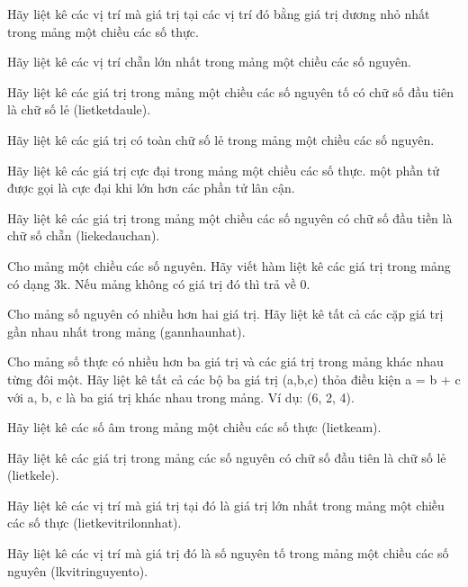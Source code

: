 \begin{problem}
    Hãy liệt kê các vị trí mà giá trị tại các vị trí đó bằng giá trị dương nhỏ nhất trong mảng một chiều các số thực.
\end{problem}
\begin{problem}
    Hãy liệt kê các vị trí chẵn lớn nhất trong mảng một chiều các số nguyên.
\end{problem}
\begin{problem}
    Hãy liệt kê các giá trị trong mảng một chiều các số nguyên tố có chữ số đầu tiên là chữ số lẻ (lietketdaule).
\end{problem}
\begin{problem}
    Hãy liệt kê các giá trị có toàn chữ số lẻ trong mảng một chiều các số nguyên.
\end{problem}
\begin{problem}
    Hãy liệt kê các giá trị cực đại trong mảng một chiều các số thực. một phần tử được gọi là cực đại khi lớn hơn các phần tử lân cận.
\end{problem}
\begin{problem}
    Hãy liệt kê các giá trị trong mảng một chiều các số nguyên có chữ số đầu tiền là chữ số chẵn (liekedauchan).
\end{problem}
\begin{problem}
    Cho mảng một chiều các số nguyên. Hãy viết hàm liệt kê các giá trị trong mảng có dạng 3k. Nếu mảng không có giá trị đó thì trả về 0.
\end{problem}
\begin{problem}
    Cho mảng số nguyên có nhiều hơn hai giá trị. Hãy liệt kê tất cả các cặp giá trị gần nhau nhất trong mảng (gannhaunhat).
\end{problem}
\begin{problem}
    Cho mảng số thực có nhiều hơn ba giá trị và các giá trị trong mảng khác nhau từng đôi một. Hãy liệt kê tất cả các bộ ba giá trị (a,b,c) thỏa điều kiện a = b + c với a, b, c là ba giá trị khác nhau trong mảng. Ví dụ: (6, 2, 4).
\end{problem}
\begin{problem}
    Hãy liệt kê các số âm trong mảng một chiều các số thực (lietkeam).
\end{problem}
\begin{problem}
    Hãy liệt kê các giá trị trong mảng các số nguyên có chữ số đầu tiên là chữ số lẻ (lietkele).
\end{problem}
\begin{problem}
    Hãy liệt kê các vị trí mà giá trị tại đó là giá trị lớn nhất trong mảng một chiều các số thực (lietkevitrilonnhat).
\end{problem}
\begin{problem}
    Hãy liệt kê các vị trí mà giá trị đó là số nguyên tố trong mảng một chiều các số nguyên (lkvitringuyento).
\end{problem}


